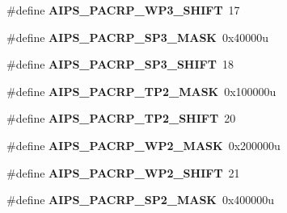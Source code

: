 \begin{DoxyCompactItemize}
\item 
\#define {\bfseries A\+I\+P\+S\+\_\+\+P\+A\+C\+R\+P\+\_\+\+W\+P3\+\_\+\+S\+H\+I\+FT}~17\hypertarget{group__AIPS__Register__Masks_ga9c72ab23c522648ec97928417aa2dc6b}{}\label{group__AIPS__Register__Masks_ga9c72ab23c522648ec97928417aa2dc6b}

\item 
\#define {\bfseries A\+I\+P\+S\+\_\+\+P\+A\+C\+R\+P\+\_\+\+S\+P3\+\_\+\+M\+A\+SK}~0x40000u\hypertarget{group__AIPS__Register__Masks_ga05e5550f34b203ff5d430797fb401ef7}{}\label{group__AIPS__Register__Masks_ga05e5550f34b203ff5d430797fb401ef7}

\item 
\#define {\bfseries A\+I\+P\+S\+\_\+\+P\+A\+C\+R\+P\+\_\+\+S\+P3\+\_\+\+S\+H\+I\+FT}~18\hypertarget{group__AIPS__Register__Masks_ga8509885d738e9c5c091ae0a8517558b6}{}\label{group__AIPS__Register__Masks_ga8509885d738e9c5c091ae0a8517558b6}

\item 
\#define {\bfseries A\+I\+P\+S\+\_\+\+P\+A\+C\+R\+P\+\_\+\+T\+P2\+\_\+\+M\+A\+SK}~0x100000u\hypertarget{group__AIPS__Register__Masks_gabbf84d32f844ae913a51937ca5fa690d}{}\label{group__AIPS__Register__Masks_gabbf84d32f844ae913a51937ca5fa690d}

\item 
\#define {\bfseries A\+I\+P\+S\+\_\+\+P\+A\+C\+R\+P\+\_\+\+T\+P2\+\_\+\+S\+H\+I\+FT}~20\hypertarget{group__AIPS__Register__Masks_gac3b6d0afb09bc7189cc8dedbdadb786e}{}\label{group__AIPS__Register__Masks_gac3b6d0afb09bc7189cc8dedbdadb786e}

\item 
\#define {\bfseries A\+I\+P\+S\+\_\+\+P\+A\+C\+R\+P\+\_\+\+W\+P2\+\_\+\+M\+A\+SK}~0x200000u\hypertarget{group__AIPS__Register__Masks_gaf7f22f436d3d6587799302a87b7013d2}{}\label{group__AIPS__Register__Masks_gaf7f22f436d3d6587799302a87b7013d2}

\item 
\#define {\bfseries A\+I\+P\+S\+\_\+\+P\+A\+C\+R\+P\+\_\+\+W\+P2\+\_\+\+S\+H\+I\+FT}~21\hypertarget{group__AIPS__Register__Masks_ga71a6e2fdd8459cd3104879db97c51b55}{}\label{group__AIPS__Register__Masks_ga71a6e2fdd8459cd3104879db97c51b55}

\item 
\#define {\bfseries A\+I\+P\+S\+\_\+\+P\+A\+C\+R\+P\+\_\+\+S\+P2\+\_\+\+M\+A\+SK}~0x400000u\hypertarget{group__AIPS__Register__Masks_gaad5030229911dedc5d1128a6e46ff0cb}{}\label{group__AIPS__Register__Masks_gaad5030229911dedc5d1128a6e46ff0cb}


\end{DoxyCompactItemize}

